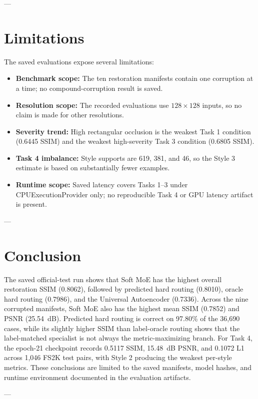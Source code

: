\documentclass[journal,compsoc]{IEEEtran}
\begin{document}
---

\section{Limitations}
\label{sec:limitations}
The saved evaluations expose several limitations:
\begin{itemize}
    \item \textbf{Benchmark scope:} The ten restoration manifests contain one corruption at a time; no compound-corruption result is saved.
    \item \textbf{Resolution scope:} The recorded evaluations use $128\times128$ inputs, so no claim is made for other resolutions.
    \item \textbf{Severity trend:} High rectangular occlusion is the weakest Task 1 condition (0.6445 SSIM) and the weakest high-severity Task 3 condition (0.6805 SSIM).
    \item \textbf{Task 4 imbalance:} Style supports are 619, 381, and 46, so the Style 3 estimate is based on substantially fewer examples.
    \item \textbf{Runtime scope:} Saved latency covers Tasks 1--3 under CPUExecutionProvider only; no reproducible Task 4 or GPU latency artifact is present.
\end{itemize}

---

\section{Conclusion}
\label{sec:conclusion}
The saved official-test run shows that Soft MoE has the highest overall restoration SSIM (0.8062), followed by predicted hard routing (0.8010), oracle hard routing (0.7986), and the Universal Autoencoder (0.7336). Across the nine corrupted manifests, Soft MoE also has the highest mean SSIM (0.7852) and PSNR (25.54~dB). Predicted hard routing is correct on 97.80\% of the 36,690 cases, while its slightly higher SSIM than label-oracle routing shows that the label-matched specialist is not always the metric-maximizing branch. For Task 4, the epoch-21 checkpoint records 0.5117 SSIM, 15.48~dB PSNR, and 0.1072 L1 across 1,046 FS2K test pairs, with Style 2 producing the weakest per-style metrics. These conclusions are limited to the saved manifests, model hashes, and runtime environment documented in the evaluation artifacts.

---



\end{document}
